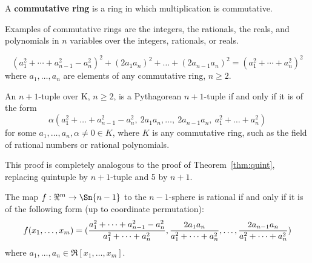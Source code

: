 \documentclass[11pt]{article}
\begin{document}
\begin{defn2}
\label{defn:commring}
A {\bf commutative ring} is a ring in which multiplication is commutative.
\end{defn2}
%
Examples of commutative rings are the integers, the rationals, the reals,
and polynomials in $n$ variables over the integers, rationals, or reals.

\begin{lemma}[Ammei]	%
\label{lem:ammei}
\begin{equation}
\label{eq:ammei}
(a_1^2 + \cdots + a_{n-1}^2 - a_n^2)^2 + (2a_1a_n)^2 + \ldots + (2a_{n-1}a_n)^2 
= (a_1^2 + \cdots + a_n^2)^2
\end{equation}
where $a_1,\ldots,a_n$ are elements of any commutative ring, $n \geq 2$.
\end{lemma}

\begin{theorem}
\label{thm:general}
An $n+1$-tuple over K, $n \geq 2$, is a Pythagorean $n+1$-tuple if and only if 
it is of the form 
\begin{equation}
\label{eq:pyth2}
	\alpha (a_1^2 + \ldots + a_{n-1}^2 - a_n^2,
		\ 2a_1a_n,\ldots,\ 2a_{n-1}a_n,
		\ a_1^2 + \ldots + a_n^2)
\end{equation}
for some $a_1,\ldots,a_n,\alpha \neq 0 \in K$,
where $K$ is any commutative ring, such as the field of rational numbers
or rational polynomials.
\end{theorem}
\prf
This proof is completely analogous to the proof of Theorem~\ref{thm:quint},
replacing quintuple by $n+1$-tuple and 5 by $n+1$.
\QED

\begin{corollary}
\label{cor:ratmap}
The map $f: \Re^m \rightarrow \Sn{n-1}$ to the $n-1$-sphere is rational if and only if
it is of the following form (up to coordinate permutation):
\begin{equation}
\label{eq:re4s3}
f(x_1,\ldots,x_m) = 
\footnotesize{(\frac{a_1^2 + \cdots + a_{n-1}^2 - a_n^2}{a_1^2 + \cdots + a_n^2},
	 \frac{2a_1a_n}{a_1^2 + \cdots + a_n^2},
	 \ldots, 
	 \frac{2a_{n-1}a_n}{a_1^2 + \cdots + a_n^2})}
\end{equation}
where $a_1,\ldots,a_n \in \Re[x_1,\ldots,x_m]$.
\end{corollary}
\end{document}
